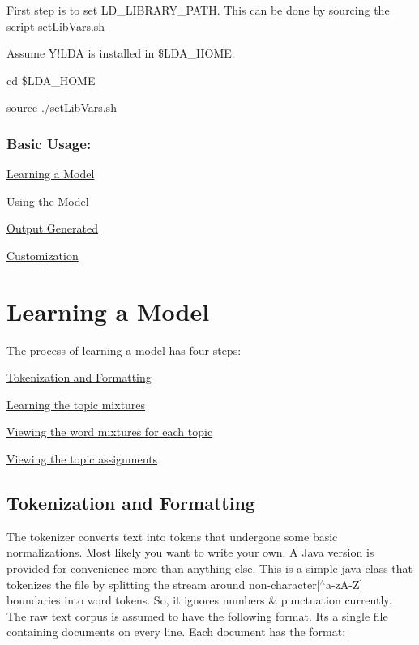 First step is to set LD\_\-LIBRARY\_\-PATH. This can be done by sourcing the script setLibVars.sh 

Assume Y!LDA is installed in \$LDA\_\-HOME. 

cd \$LDA\_\-HOME 

source ./setLibVars.sh \subsubsection*{Basic Usage: }


\begin{DoxyEnumerate}
\item \hyperlink{single__machine__usage_learning_model}{Learning a Model} 
\item \hyperlink{single__machine__usage_using_model}{Using the Model} 
\item \hyperlink{single__machine__usage_generated_output}{Output Generated} 
\item \hyperlink{single__machine__usage_customizations}{Customization} 
\end{DoxyEnumerate}\hypertarget{single__machine__usage_learning_model}{}\section{Learning a Model}\label{single__machine__usage_learning_model}
The process of learning a model has four steps: 
\begin{DoxyEnumerate}
\item \hyperlink{single__machine__usage_tokenize_format}{Tokenization and Formatting}  
\item \hyperlink{single__machine__usage_learntopics}{Learning the topic mixtures}  
\item \hyperlink{single__machine__usage_word_mix}{Viewing the word mixtures for each topic}  
\item \hyperlink{single__machine__usage_topic_mix}{Viewing the topic assignments}  
\end{DoxyEnumerate}\hypertarget{single__machine__usage_tokenize_format}{}\subsection{Tokenization and Formatting}\label{single__machine__usage_tokenize_format}
The tokenizer converts text into tokens that undergone some basic normalizations. Most likely you want to write your own. A Java version is provided for convenience more than anything else. This is a simple java class that tokenizes the file by splitting the stream around non-\/character\mbox{[}$^\wedge$a-\/zA-\/Z\mbox{]} boundaries into word tokens. So, it ignores numbers \& punctuation currently. The raw text corpus is assumed to have the following format. Its a single file containing documents on every line. Each document has the format: 

